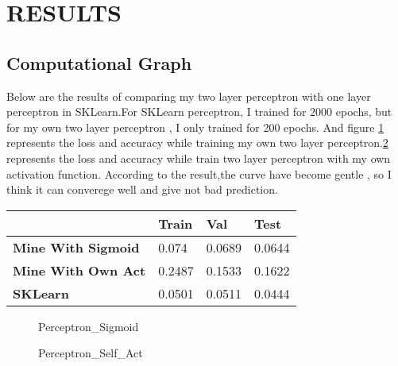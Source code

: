 \documentclass[conference]{IEEEtran}
\begin{document}
\section{RESULTS}
    \subsection{Computational Graph}
        Below are the results of comparing my two layer perceptron with one layer perceptron in SKLearn.For SKLearn perceptron, I trained for 2000 epochs, but for my own two layer perceptron , I only trained for 200 epochs. And figure \ref{fig:perceptron} represents the loss and accuracy while training my own two layer perceptron.\ref{fig:perceptron_self_act} represents the loss and accuracy while train two layer perceptron with my own activation function. According to the result,the curve have become gentle , so I think it can converege well and give not bad prediction.
        \begin{table}[htb]
        \begin{center}
            \begin{tabular}{l|l|l|l}
                             &   Train   &   Val  &   Test  \\ \hline
            \textbf{Mine With Sigmoid}    &   0.074  & 0.0689 & 0.0644 \\ 
            \textbf{Mine With Own Act}    &   0.2487  & 0.1533 & 0.1622  \\ 
            \textbf{SKLearn} &   0.0501  & 0.0511 & 0.0444  \\ 
        \end{tabular}
        \end{center}
        \end{table}
        

        \begin{figure}[htb]
            \centering
            \renewcommand{\figurename}{Figure}
            \caption{Perceptron\_Sigmoid}
            \label{fig:perceptron}
        \end{figure}

        \begin{figure}[htb]
            \centering
            \renewcommand{\figurename}{Figure}
            \caption{Perceptron\_Self\_Act}
            \label{fig:perceptron_self_act}
        \end{figure}
        
\end{document}
